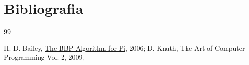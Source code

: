 \newpage
\section{Bibliografia}

\renewcommand{\section}[2]{}
\begin{thebibliography} {99}

		H. D. Bailey,
		\href{http://www.davidhbailey.com/dhbpapers/bbp-alg.pdf}{The BBP Algorithm for Pi},
		2006;
		D. Knuth,
		The Art of Computer Programming Vol. 2,
		2009;
\end{thebibliography}
